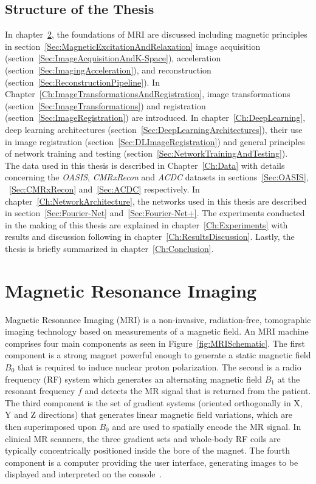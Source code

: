 \documentclass[english,version-2022-01]{uzl-thesis} %
\begin{document}
\section{Structure of the Thesis} \label{Sec:Structure}
In chapter~\ref{Ch:MRI}, the foundations of MRI are discussed including magnetic principles in section~\ref{Sec:MagneticExcitationAndRelaxation} image acquisition (section~\ref{Sec:ImageAcquisitionAndK-Space}), acceleration (section~\ref{Sec:ImagingAcceleration}), and reconstruction (section~\ref{Sec:ReconstructionPipeline}). In Chapter~\ref{Ch:ImageTransformationsAndRegistration}, image transformations (section~\ref{Sec:ImageTransformations}) and registration (section~\ref{Sec:ImageRegistration}) are introduced. In chapter~\ref{Ch:DeepLearning}, deep learning architectures (section~\ref{Sec:DeepLearningArchitectures}), their use in image registration (section~\ref{Sec:DLImageRegistration}) and general principles of network training and testing (section~\ref{Sec:NetworkTrainingAndTesting}).\\
The data used in this thesis is described in Chapter~\ref{Ch:Data} with details concerning the \emph{OASIS}, \emph{CMRxRecon} and \emph{ACDC} datasets in sections~\ref{Sec:OASIS}, ~\ref{Sec:CMRxRecon} and~\ref{Sec:ACDC} respectively.%
In chapter~\ref{Ch:NetworkArchitecture}, the networks used in this thesis
are described in section~\ref{Sec:Fourier-Net} and~\ref{Sec:Fourier-Net+}.%
The experiments conducted in the making of this thesis are explained in chapter~\ref{Ch:Experiments} with results and discussion following in chapter~\ref{Ch:ResultsDiscussion}.%
Lastly, the thesis is briefly summarized in chapter~\ref{Ch:Conclusion}.



\chapter{Magnetic Resonance Imaging} \label{Ch:MRI}
Magnetic Resonance Imaging (MRI) is a non-invasive, radiation-free, tomographic imaging technology based on measurements of a magnetic field.  An MRI machine comprises four main components as seen in Figure~\ref{fig:MRISchematic}. The first component is a strong magnet powerful enough to generate a static magnetic field $B_0$ that is required to induce nuclear proton polarization. The second is a radio frequency (RF) system which generates an alternating magnetic field $B_1$ at the resonant frequency $f$ and detects the MR signal that is returned from the patient. The third component is the set of gradient systems (oriented orthogonally in X, Y and Z directions) that generates linear magnetic field variations, which are then superimposed upon $B_0$ and are used to spatially encode the MR signal. In clinical MR scanners, the three gradient sets and whole-body RF coils are typically concentrically positioned inside the bore of the magnet. The fourth component is a computer providing the user interface, generating images to be displayed and interpreted on the console~\cite{Serai2021}.
\end{document}
